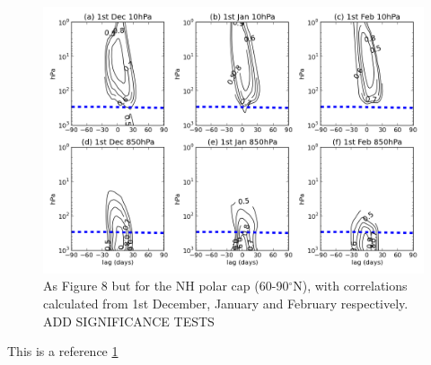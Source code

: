 \begin{figure}[htbp]
\centering
\includegraphics{./figures/lag_corrs_NH_DJF.png}
\caption{As Figure 8 but for the NH polar cap (60-90$^{\circ}$N), with
correlations calculated from 1st December, January and February
respectively. ADD SIGNIFICANCE TESTS \label{figure}}
\end{figure}

This is a reference \ref{figure}

